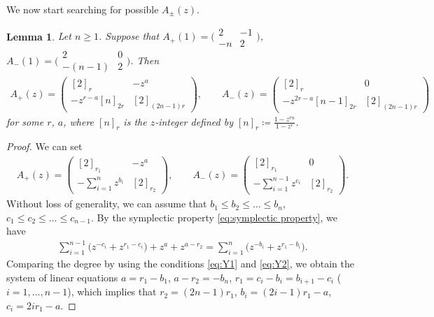 \documentclass[10pt,a4paper]{amsart}
\numberwithin{equation}{section}
\newtheorem{Lemma}[Theorem]{Lemma}
\theoremstyle{definition}
\begin{document}
We now start searching for possible $A_\pm(z)$.

\begin{Lemma}\label{lemma:Apm(z) 1 2 3}
 Let $n \geq 1$.
 Suppose that
$
 A_{+}(1) =
 \bigl( \begin{smallmatrix}
 2 & - 1 \\
 - n & 2
\end{smallmatrix}\bigr)$, $
 A_{-}(1) =
 \bigl( \begin{smallmatrix}
 2 & 0 \\
 - (n-1) & 2
 \end{smallmatrix}\bigr)$.
 Then
 \begin{align*}
 A_{+}(z) =
 \begin{pmatrix}
 [2]_r & - z^{a} \\
 - z^{r-a} [n]_{2r} & [2]_{(2n-1)r}
 \end{pmatrix},\qquad
 A_{-}(z) =
 \begin{pmatrix}
 [2]_r & 0 \\
 - z^{2r-a} [n-1]_{2r} & [2]_{(2n-1)r}
 \end{pmatrix}
 \end{align*}
 for some $r$, $a$, where $[n]_r$ is the \emph{$z$-integer} defined by
$
 [n]_r \coloneqq \frac{1 - z^{rn}}{1 - z^r}$.
\end{Lemma}
\begin{proof}
 We can set
 \begin{align*}
 A_{+}(z) =
 \begin{pmatrix}
 [2]_{r_1} & - z^a \\
 - \sum\limits_{i=1}^n z^{b_i} & [2]_{r_2}
 \end{pmatrix},\qquad
 A_{-}(z) =
 \begin{pmatrix}
 [2]_{r_1} & 0 \\
 - \sum\limits_{i=1}^{n-1} z^{c_i} & [2]_{r_2}
 \end{pmatrix}.
 \end{align*}
 Without loss of generality, we can assume that
$b_1 \leq b_2 \leq \dots \leq b_n$, $
 c_1 \leq c_2 \leq \dots \leq c_{n-1}$.
 By the symplectic property \eqref{eq:symplectic property}, we have
 \begin{align*}
 \sum_{i=1}^{n-1}\bigl(z^{-c_i} + z^{r_1 - c_i}\bigr) + z^{a} + z^{a-r_2} =
 \sum_{i=1}^{n} \bigl(z^{-b_i} + z^{r_1 - b_i}\bigr).
 \end{align*}
 Comparing the degree by using the conditions \eqref{eq:Y1} and \eqref{eq:Y2}, we obtain the
 system of linear equations
$
 a = r_1 - b_1$, $ a-r_2 = -b_n$, $
 r_1 = c_i - b_i = b_{i+1} - c_i $ ($i=1,\dots,n-1$),
 which implies that
$
 r_2 = (2n-1) r_1$, $
 b_i = (2i - 1) r_1 - a$, $
 c_i = 2i r_1 - a$.
\end{proof}
\end{document}
